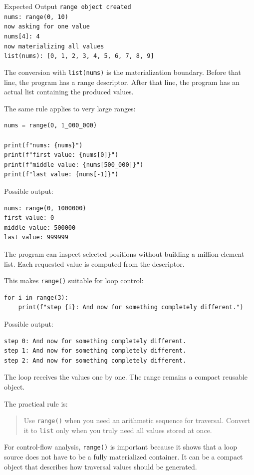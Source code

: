 \begin{iobox}{Expected Output}
\texttt{range object created} \\
\texttt{nums: range(0, 10)} \\
\texttt{now asking for one value} \\
\texttt{nums[4]: 4} \\
\texttt{now materializing all values} \\
\texttt{list(nums): [0, 1, 2, 3, 4, 5, 6, 7, 8, 9]} \\
\end{iobox}


The conversion with \texttt{list(nums)} is the materialization boundary. Before that line, the program has a range descriptor. After that line, the program has an actual list containing the produced values.

The same rule applies to very large ranges:

\begin{verbatim}
nums = range(0, 1_000_000)

print(f"nums: {nums}")
print(f"first value: {nums[0]}")
print(f"middle value: {nums[500_000]}")
print(f"last value: {nums[-1]}")
\end{verbatim}

Possible output:

\begin{verbatim}
nums: range(0, 1000000)
first value: 0
middle value: 500000
last value: 999999
\end{verbatim}

The program can inspect selected positions without building a million-element list. Each requested value is computed from the descriptor.

This makes \texttt{range()} suitable for loop control:

\begin{verbatim}
for i in range(3):
    print(f"step {i}: And now for something completely different.")
\end{verbatim}

Possible output:

\begin{verbatim}
step 0: And now for something completely different.
step 1: And now for something completely different.
step 2: And now for something completely different.
\end{verbatim}

The loop receives the values one by one. The range remains a compact reusable object.

The practical rule is:

\begin{quote}
Use \texttt{range()} when you need an arithmetic sequence for traversal. Convert it to \texttt{list} only when you truly need all values stored at once.
\end{quote}

For control-flow analysis, \texttt{range()} is important because it shows that a loop source does not have to be a fully materialized container. It can be a compact object that describes how traversal values should be generated.